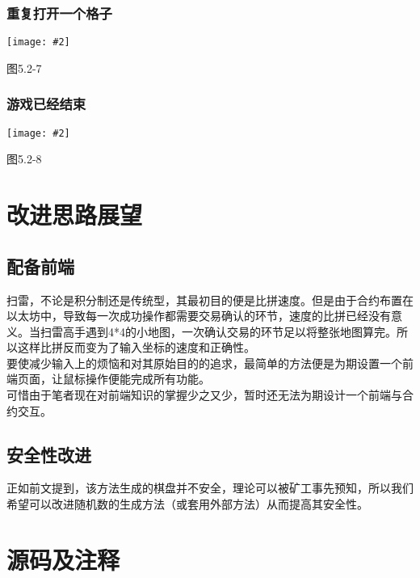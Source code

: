 \documentclass[UTF8]{ctexart}
\newcommand\picturehere[2][1]{\centerline{\texttt{[image: \#2]}}}
\begin{document}
		\subsubsection{重复打开一个格子}
		\picturehere[0.666]{s25.png}
		\begin{center} 图5.2-7 \end{center} %

		\subsubsection{游戏已经结束}
		\picturehere[0.666]{s21.png}
		\begin{center} 图5.2-8 \end{center} %

	\newpage
	\section{改进思路展望}
	\subsection{配备前端}
	\indent 扫雷，不论是积分制还是传统型，其最初目的便是比拼速度。但是由于合约布置在以太坊中，导致每一次成功操作都需要交易确认的环节，速度的比拼已经没有意义。当扫雷高手遇到4*4的小地图，一次确认交易的环节足以将整张地图算完。所以这样比拼反而变为了输入坐标的速度和正确性。\\
	\indent 要使减少输入上的烦恼和对其原始目的的追求，最简单的方法便是为期设置一个前端页面，让鼠标操作便能完成所有功能。\\
	\indent 可惜由于笔者现在对前端知识的掌握少之又少，暂时还无法为期设计一个前端与合约交互。
	\subsection{安全性改进}
	\indent 正如前文提到，该方法生成的棋盘并不安全，理论可以被矿工事先预知，所以我们希望可以改进随机数的生成方法（或套用外部方法）从而提高其安全性。


	\section{源码及注释}
\end{document}
